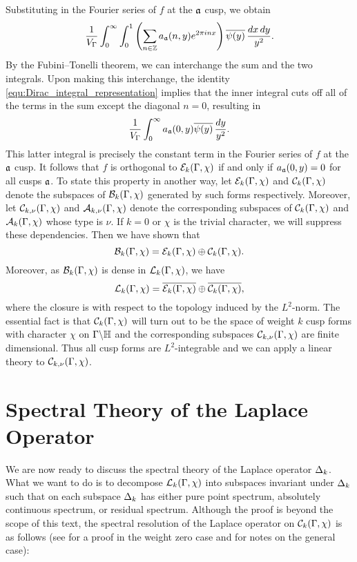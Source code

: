     Substituting in the Fourier series of $f$ at the $\mathfrak{a}$ cusp, we obtain
    \[
       \frac{1}{V_{\Gamma}}\int_{0}^{\infty}\int_{0}^{1}\left(\sum_{n \in \mathbb{Z}}a_{\mathfrak{a}}(n,y)e^{2\pi inx}\right)\overline{\psi(y)}\,\frac{dx\,dy}{y^{2}}.
    \]
    By the Fubini–Tonelli theorem, we can interchange the sum and the two integrals. Upon making this interchange, the identity \cref{equ:Dirac_integral_representation} implies that the inner integral cuts off all of the terms in the sum except the diagonal $n = 0$, resulting in
    \[
      \frac{1}{V_{\Gamma}}\int_{0}^{\infty}a_{\mathfrak{a}}(0,y)\overline{\psi(y)}\,\frac{dy}{y^{2}}.
    \]
    This latter integral is precisely the constant term in the Fourier series of $f$ at the $\mathfrak{a}$ cusp. It follows that $f$ is orthogonal to $\mathcal{E}_{k}(\Gamma,\chi)$ if and only if $a_{\mathfrak{a}}(0,y) = 0$ for all cusps $\mathfrak{a}$. To state this property in another way, let $\mathcal{E}_{k}(\Gamma,\chi)$ and $\mathcal{C}_{k}(\Gamma,\chi)$ denote the subspaces of $\mathcal{B}_{k}(\Gamma,\chi)$ generated by such forms respectively. Moreover, let $\mathcal{C}_{k,\nu}(\Gamma,\chi)$ and $\mathcal{A}_{k,\nu}(\Gamma,\chi)$ denote the corresponding subspaces of $\mathcal{C}_{k}(\Gamma,\chi)$ and $\mathcal{A}_{k}(\Gamma,\chi)$ whose type is $\nu$. If $k = 0$ or $\chi$ is the trivial character, we will suppress these dependencies. Then we have shown that
    \[
      \mathcal{B}_{k}(\Gamma,\chi) = \mathcal{E}_{k}(\Gamma,\chi) \oplus \mathcal{C}_{k}(\Gamma,\chi).
    \]
    Moreover, as $\mathcal{B}_{k}(\Gamma,\chi)$ is dense in $\mathcal{L}_{k}(\Gamma,\chi)$, we have
    \[
      \mathcal{L}_{k}(\Gamma,\chi) = \overline{\mathcal{E}_{k}(\Gamma,\chi)} \oplus \overline{\mathcal{C}_{k}(\Gamma,\chi)},
    \]
    where the closure is with respect to the topology induced by the $L^{2}$-norm. The essential fact is that $\mathcal{C}_{k}(\Gamma,\chi)$ will turn out to be the space of weight $k$ cusp forms with character $\chi$ on $\Gamma\backslash\mathbb{H}$ and the corresponding subspaces $\mathcal{C}_{k,\nu}(\Gamma,\chi)$ are finite dimensional. Thus all cusp forms are $L^{2}$-integrable and we can apply a linear theory to $\mathcal{C}_{k,\nu}(\Gamma,\chi)$.
  \section{Spectral Theory of the Laplace Operator}
    We are now ready to discuss the spectral theory of the Laplace operator $\Delta_{k}$. What we want to do is to decompose $\mathcal{L}_{k}(\Gamma,\chi)$ into subspaces invariant under $\Delta_{k}$ such that on each subspace $\Delta_{k}$ has either pure point spectrum, absolutely continuous spectrum, or residual spectrum. Although the proof is beyond the scope of this text, the spectral resolution of the Laplace operator on $\mathcal{C}_{k}(\Gamma,\chi)$ is as follows (see \cite{iwaniec2002spectral} for a proof in the weight zero case and \cite{duke2002subconvexity} for notes on the general case):

